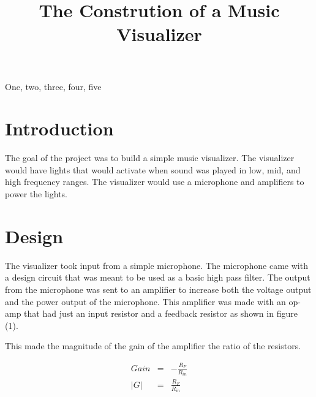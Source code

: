 \documentclass{article}
\begin{document}
\sloppy

\def\x{{\mathbf x}}
\def\L{{\cal L}}


\title{The Constrution of a Music Visualizer}
%


\address{}


\maketitle


\begin{abstract}

\end{abstract}
%
\begin{keywords}
One, two, three, four, five
\end{keywords}
%
\section{Introduction}
\label{sec:intro}

The goal of the project was to build a simple music visualizer. The visualizer would have lights that would activate when sound was played in low, mid, and high frequency ranges. The visualizer would use a microphone and amplifiers to power the lights.

\section{Design}
The visualizer took input from a simple microphone. The microphone came with a design circuit that was meant to be used as a basic high pass filter. The output from the microphone was sent to an amplifier to increase both the voltage output and the power output of the microphone. This amplifier was made with an op-amp that had just an input resistor and a feedback resistor as shown in figure (1).


This made the magnitude of the gain of the amplifier the ratio of the resistors.

\begin{eqnarray}
Gain &=& -\frac{R_F}{R_{in}} \nonumber \\
|G| &=& \frac{R_F}{R_{in}} 
\end{eqnarray}
\end{document}
